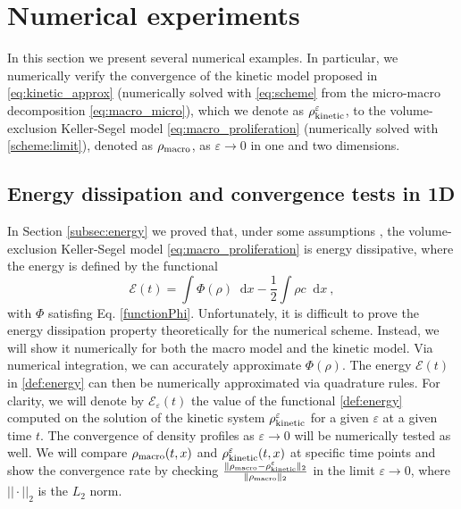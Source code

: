 \documentclass{aims} %
\theoremstyle{definition}
\newcommand {\e}  {\varepsilon}
\newcommand*\diff{\mathop{}\!\mathrm{d}}
\begin{document}
\section{Numerical experiments}\label{numerical results}

In this section we present several numerical examples.
In particular, we {numerically verify} the convergence of the kinetic model proposed in \eqref{eq:kinetic_approx} (numerically solved with \eqref{eq:scheme} from the micro-macro decomposition \eqref{eq:macro_micro}), which we denote as $\rho_\textnormal{kinetic}^\e$, to the volume-exclusion Keller-Segel model \eqref{eq:macro_proliferation} (numerically solved with \eqref{scheme:limit}), denoted as $\rho_\textnormal{macro}$, as $\varepsilon\to 0$ in one and two dimensions. 
\subsection{Energy dissipation and convergence tests in 1D}\label{subsec:energy_dissipation}
In Section \ref{subsec:energy} we proved that, under some assumptions \cite{calvez2006volume,carrillo2001entropy,de2018energy}, the volume-exclusion Keller-Segel model \eqref{eq:macro_proliferation} is energy dissipative, 
{where the energy is defined by the functional
\begin{equation}\label{def:energy}
    \mathcal{E}(t)=\int\Phi(\rho)\diff x-\frac{1}{2}\int\rho c\diff x\ ,    
\end{equation}
\noindent with $ \Phi $ satisfing Eq. \eqref{functionPhi}. 
{ Unfortunately, it is difficult to prove the energy dissipation property theoretically for the numerical scheme. 
Instead, we will show it numerically for both the macro model and the kinetic model. 
}
{Via numerical integration, we can accurately approximate $\Phi(\rho)$. The energy $\mathcal{E}(t)$ in \eqref{def:energy} can then be numerically approximated via quadrature rules.} 
For clarity, we will denote by $\mathcal{E}_\e(t)$ the value of the functional \eqref{def:energy} computed on the solution of the kinetic system $\rho_\textnormal{kinetic}^\e$ for a given $\e$ at a given time $t$. } 
The convergence of density profiles as $\varepsilon\to0$ will be numerically tested as well. 
We will compare $\rho_\textnormal{macro}(t,x)$ and $\rho_\textnormal{kinetic}^{\varepsilon}(t,x)$ at specific time points and show the convergence rate by checking $\frac{\|\rho_\textnormal{macro}-\rho_\textnormal{kinetic}^{\varepsilon}\|_2}{\| \rho_\textnormal{macro}\|_2}$ in the limit $\varepsilon\to0$, where $||\cdot||_2$ is the $L_2$ norm.
\end{document}
